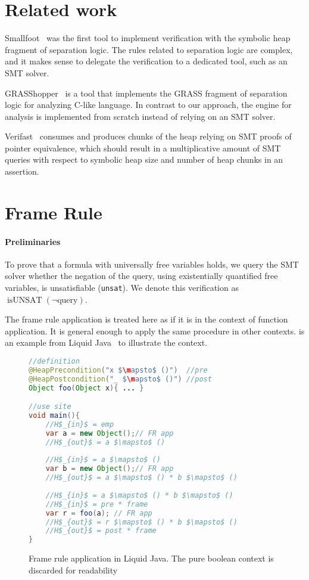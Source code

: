 \documentclass[sigplan,screen,review]{acmart}
\begin{document}
\section{Related work}

Smallfoot~\cite{DBLP:conf/fmco/BerdineCO05} was the first tool to implement verification with the symbolic heap fragment of separation logic. The rules related to separation logic are complex, and it makes sense to delegate the verification to a dedicated tool, such as an SMT solver. 

GRASShopper~\cite{piskac2014grasshopper} is a tool that implements the GRASS fragment of separation logic for analyzing C-like language. In contrast to our approach, the engine for analysis is implemented from scratch instead of relying on an SMT solver.

Verifast~\cite{jacobs2011verifast} consumes and produces chunks of the heap relying on SMT proofs of pointer equivalence, which should result in a multiplicative amount of SMT queries with respect to symbolic heap size and number of heap chunks in an assertion.

\section{Frame Rule}

\paragraph{Preliminaries} To prove that a formula with universally free variables holds, we query the SMT solver whether the negation of the query, using existentially quantified free variables, is unsatisfiable (\texttt{unsat}). We denote this verification as $\operatorname{isUNSAT}(\neg\mbox{query})$.

The frame rule application is treated here as if it is in the context of function application. It is general enough to apply the same procedure in other contexts.  is an example from Liquid Java~\cite{gamboa2021user} to illustrate the context.

\begin{figure}
    \centering
    \begin{lstlisting}[language=Java]
//definition
@HeapPrecondition("x $\mapsto$ ()")  //pre
@HeapPostcondition("_ $\mapsto$ ()") //post
Object foo(Object x){ ... }

//use site
void main(){
    //H$_{in}$ = emp
    var a = new Object();// FR app
    //H$_{out}$ = a $\mapsto$ ()
    
    //H$_{in}$ = a $\mapsto$ ()
    var b = new Object();// FR app
    //H$_{out}$ = a $\mapsto$ () * b $\mapsto$ () 
    
    //H$_{in}$ = a $\mapsto$ () * b $\mapsto$ () 
    //H$_{in}$ = pre * frame
    var r = foo(a); // FR app
    //H$_{out}$ = r $\mapsto$ () * b $\mapsto$ ()
    //H$_{out}$ = post * frame
}
\end{lstlisting}
    \caption{Frame rule application in Liquid Java. The pure boolean context is discarded for readability}
    \label{fig:FRAPP}
\end{figure}
\end{document}
